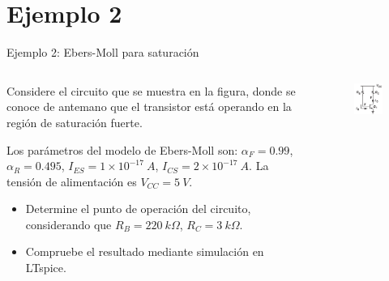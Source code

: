 \documentclass[t,aspectratio=169]{beamer}
\begin{document}
\section{Ejemplo 2}
\begin{frame}{Ejemplo 2: Ebers-Moll para saturación}



\begin{columns}

\begin{column}{0.7\textwidth}

Considere el circuito que se muestra en la figura, donde se conoce de antemano que el transistor está operando en la región de saturación fuerte. 

\vspace{3mm}Los parámetros del modelo de Ebers-Moll son: $\alpha_F=0.99$, $\alpha_R=0.495$, $I_{ES}=1\times{}10^{-17}\ A$, $I_{CS}=2\times{}10^{-17}\ A$. La tensión de alimentación es $V_{CC} = 5\ V$.

\vspace{3mm}
\begin{itemize}
    \item Determine el punto de operación del circuito, considerando que $R_B = 220\ k\Omega$, $R_C = 3\ k\Omega$.
    \item Compruebe el resultado mediante simulación en LTspice.
\end{itemize}

\end{column}

\begin{column}{0.3\textwidth}

\begin{figure}
    \centering
    \includegraphics[width=\textwidth]{figuras/ebers_moll_circuito_ejemplo_1.png}
\end{figure}


\end{column}
\end{columns}
\end{frame}
\end{document}
